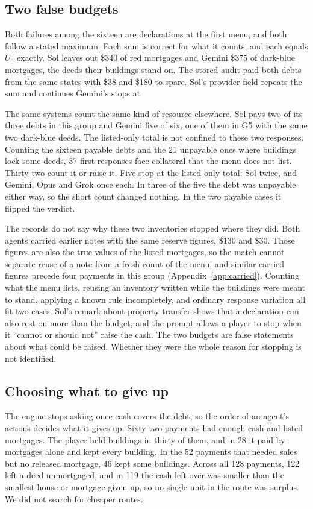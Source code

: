 \subsection{Two false budgets}
\label{sec:false}
Both failures among the sixteen are declarations at the first menu, and both follow a stated maximum:
Each sum is correct for what it counts, and each equals $U_0$ exactly. Sol leaves out \$340 of red mortgages and Gemini \$375 of dark-blue mortgages, the deeds their buildings stand on. The stored audit paid both debts from the same states with \$38 and \$180 to spare. Sol's provider field repeats the sum and continues  Gemini's stops at 

The same systems count the same kind of resource elsewhere. Sol pays two of its three debts in this group and Gemini five of six, one of them in G5 with the same two dark-blue deeds. The listed-only total is not confined to these two responses. Counting the sixteen payable debts and the 21 unpayable ones where buildings lock some deeds, 37 first responses face collateral that the menu does not list. Thirty-two count it or raise it. Five stop at the listed-only total: Sol twice, and Gemini, Opus and Grok once each. In three of the five the debt was unpayable either way, so the short count changed nothing. In the two payable cases it flipped the verdict.

The records do not say why these two inventories stopped where they did. Both agents carried earlier notes with the same reserve figures, \$130 and \$30. Those figures are also the true values of the listed mortgages, so the match cannot separate reuse of a note from a fresh count of the menu, and similar carried figures precede four payments in this group (Appendix~\ref{app:carried}). Counting what the menu lists, reusing an inventory written while the buildings were meant to stand, applying a known rule incompletely, and ordinary response variation all fit two cases. Sol's remark about property transfer shows that a declaration can also rest on more than the budget, and the prompt allows a player to stop when it ``cannot or should not'' raise the cash. The two budgets are false statements about what could be raised. Whether they were the whole reason for stopping is not identified.

\subsection{Choosing what to give up}
The engine stops asking once cash covers the debt, so the order of an agent's actions decides what it gives up. Sixty-two payments had enough cash and listed mortgages. The player held buildings in thirty of them, and in 28 it paid by mortgages alone and kept every building. In the 52 payments that needed sales but no released mortgage, 46 kept some buildings. Across all 128 payments, 122 left a deed unmortgaged, and in 119 the cash left over was smaller than the smallest house or mortgage given up, so no single unit in the route was surplus. We did not search for cheaper routes.

